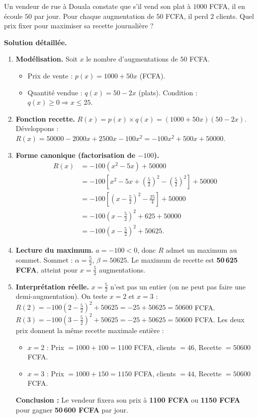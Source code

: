 \documentclass[11pt]{article}
\begin{document}
\begin{exoresolu}
Un vendeur de rue à Douala constate que s'il vend son plat à $1000$ FCFA, il en écoule $50$ par jour. Pour chaque augmentation de $50$ FCFA, il perd $2$ clients. Quel prix fixer pour maximiser sa recette journalière ?

\textbf{Solution détaillée.}

\begin{enumerate}
\item \textbf{Modélisation.} Soit $x$ le nombre d'augmentations de $50$ FCFA.
\begin{itemize}
\item Prix de vente : $p(x) = 1000 + 50x$ (FCFA).
\item Quantité vendue : $q(x) = 50 - 2x$ (plats). Condition : $q(x) \ge 0 \Rightarrow x \le 25$.
\end{itemize}
\item \textbf{Fonction recette.}
$R(x) = p(x) \times q(x) = (1000 + 50x)(50 - 2x)$.
Développons :
$R(x) = 50000 - 2000x + 2500x - 100x^2 = -100x^2 + 500x + 50000$.
\item \textbf{Forme canonique (factorisation de $-100$).}
\begin{align*}
R(x) &= -100(x^2 - 5x) + 50000 \\
&= -100\left[ x^2 - 5x + \left(\frac{5}{2}\right)^2 - \left(\frac{5}{2}\right)^2 \right] + 50000 \\
&= -100\left[ \left(x - \frac{5}{2}\right)^2 - \frac{25}{4} \right] + 50000 \\
&= -100\left(x - \frac{5}{2}\right)^2 + 625 + 50000 \\
&= -100\left(x - \frac{5}{2}\right)^2 + 50625.
\end{align*}
\item \textbf{Lecture du maximum.}
$a = -100 < 0$, donc $R$ admet un maximum au sommet.
Sommet : $\alpha = \frac{5}{2}$, $\beta = 50625$.
Le maximum de recette est \textbf{50\,625 FCFA}, atteint pour $x = \frac{5}{2}$ augmentations.
\item \textbf{Interprétation réelle.}
$x=\frac{5}{2}$ n'est pas un entier (on ne peut pas faire une demi-augmentation). On teste $x=2$ et $x=3$ :
$R(2) = -100(2-\frac{5}{2})^2 + 50625 = -25 + 50625 = 50600$ FCFA.
$R(3) = -100(3-\frac{5}{2})^2 + 50625 = -25 + 50625 = 50600$ FCFA.
Les deux prix donnent la même recette maximale entière :
\begin{itemize}
\item $x=2$ : Prix $= 1000 + 100 = 1100$ FCFA, clients $= 46$, Recette $= 50600$ FCFA.
\item $x=3$ : Prix $= 1000 + 150 = 1150$ FCFA, clients $= 44$, Recette $= 50600$ FCFA.
\end{itemize}
\textbf{Conclusion :} Le vendeur fixera son prix à \textbf{1100 FCFA} ou \textbf{1150 FCFA} pour gagner \textbf{50\,600 FCFA} par jour.
\end{enumerate}
\end{exoresolu}
\end{document}
